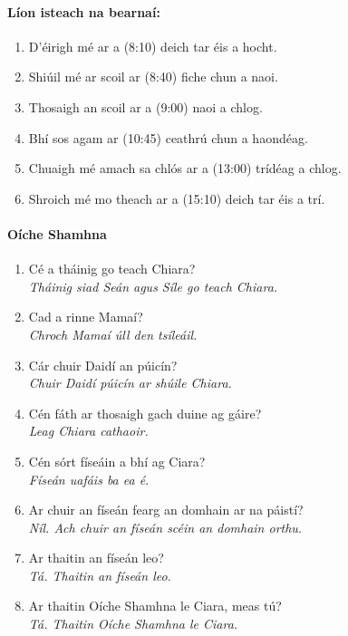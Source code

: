 \documentclass[article,a4paper,oneside,12pt]{memoir}
\begin{document}
\paragraph{Líon isteach na bearnaí:}

\begin{enumerate}
  \item D'\'{e}irigh m\'{e} ar a (8:10) deich tar \'{e}is a hocht.
  \item Shiúil m\'{e} ar scoil ar (8:40) fiche chun a naoi.
  \item Thosaigh an scoil ar a (9:00) naoi a chlog.
  \item Bhí sos agam ar (10:45) ceathrú chun a haond\'{e}ag.
  \item Chuaigh m\'{e} amach sa chlós ar a (13:00) tríd\'{e}ag a chlog.
  \item Shroich m\'{e} mo theach ar a (15:10) deich tar \'{e}is a trí.
\end{enumerate}

\clearpage

\paragraph{Oíche Shamhna}

\begin{enumerate}
  \item C\'{e} a tháinig go teach Chiara?\\\emph{Tháinig siad Seán agus Síle go 
    	teach Chiara.}
  \item Cad a rinne Mamaí?\\\emph{Chroch Mamaí úll den tsíleáil.}
  \item Cár chuir Daidí an púicín?\\\emph{Chuir Daidí púicín ar shúile Chiara.}
  \item C\'{e}n fáth ar thosaigh gach duine ag gáire?\\\emph{Leag Chiara 
    	cathaoir.}
  \item C\'{e}n sórt físeáin a bhí ag Ciara?\\\emph{Físeán uafáis ba ea 
  	\'{e}.}
  \item Ar chuir an físeán fearg an domhain ar na páistí?\\\emph{Níl. Ach 
	chuir an físeán sc\'{e}in an domhain orthu.}
  \item Ar thaitin an físeán leo?\\\emph{Tá. Thaitin an físeán leo.}
  \item Ar thaitin Oíche Shamhna le Ciara, meas tú?\\\emph{Tá. Thaitin Oíche 
    	Shamhna le Ciara.}
\end{enumerate}
\end{document}
